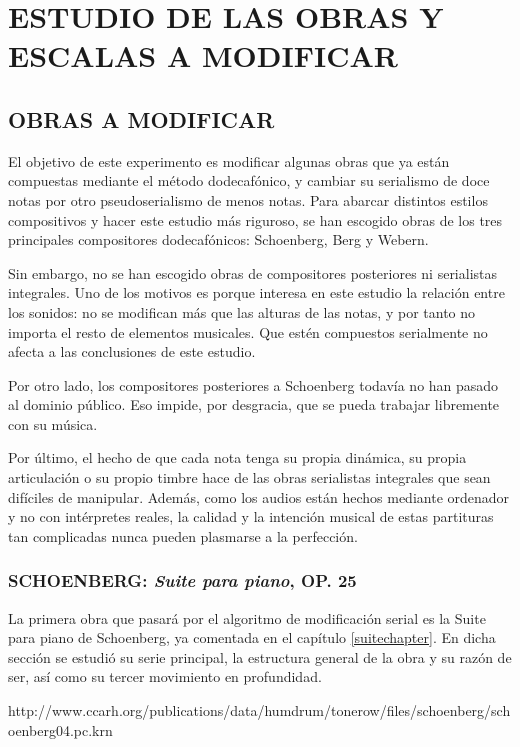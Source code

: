 	\chapter{ESTUDIO DE LAS OBRAS Y ESCALAS A MODIFICAR}
    \section{OBRAS A MODIFICAR}
    	El objetivo de este experimento es modificar algunas obras que ya están compuestas mediante el método dodecafónico, y cambiar su serialismo de doce notas por otro pseudoserialismo de menos notas. Para abarcar distintos estilos compositivos y hacer este estudio más riguroso, se han escogido obras de los tres principales compositores dodecafónicos: Schoenberg, Berg y Webern.
        
        Sin embargo, no se han escogido obras de compositores posteriores ni serialistas integrales. Uno de los motivos es porque interesa en este estudio la relación entre los sonidos: no se modifican más que las alturas de las notas, y por tanto no importa el resto de elementos musicales. Que estén compuestos serialmente no afecta a las conclusiones de este estudio.
        
        Por otro lado, los compositores posteriores a Schoenberg todavía no han pasado al dominio público. Eso impide, por desgracia, que se pueda trabajar libremente con su música.
        
        Por último, el hecho de que cada nota tenga su propia dinámica, su propia articulación o su propio timbre hace de las obras serialistas integrales que sean difíciles de manipular. Además, como los audios están hechos mediante ordenador y no con intérpretes reales, la calidad y la intención musical de estas partituras tan complicadas nunca pueden plasmarse a la perfección.
        
    	\subsection{SCHOENBERG: \textit{Suite para piano}, OP. 25}
        	La primera obra que pasará por el algoritmo de modificación serial es la Suite para piano de Schoenberg, ya comentada en el capítulo \ref{suitechapter}. En dicha sección se estudió su serie principal, la estructura general de la obra y su razón de ser, así como su tercer movimiento en profundidad.
            
            http://www.ccarh.org/publications/data/humdrum/tonerow/files/schoenberg/schoenberg04.pc.krn
            
